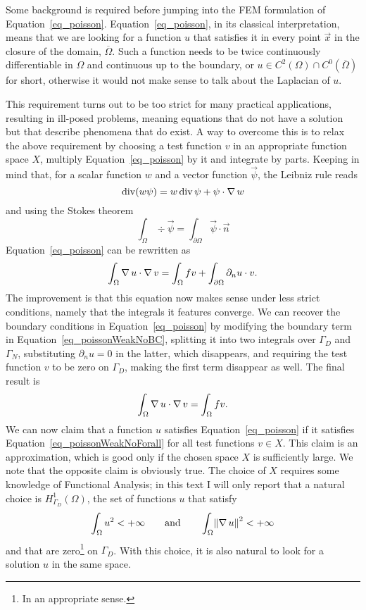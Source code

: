 Some background is required before jumping into the FEM formulation of Equation~\eqref{eq_poisson}.
Equation~\eqref{eq_poisson}, in its classical interpretation, means that we are looking for a function \(u\) that satisfies it in every point \(\vec{x}\) in the closure of the domain, \(\overline\Omega\).
Such a function needs to be twice continuously differentiable in \(\Omega\) and continuous up to the boundary, or \(u \in C^2(\Omega) \cap C^0(\overline\Omega)\) for short, otherwise it would not make sense to talk about the Laplacian of \(u\).

This requirement turns out to be too strict for many practical applications, resulting in ill-posed problems, meaning equations that do not have a solution but that describe phenomena that do exist.
A way to overcome this is to relax the above requirement by choosing a test function \(v\) in an appropriate function space \(X\), multiply Equation~\eqref{eq_poisson} by it and integrate by parts.
Keeping in mind that, for a scalar function \(w\) and a vector function \(\vec{\psi}\), the Leibniz rule reads
\begin{equation}
  \operatorname{div}(w \mathbf{\psi}) = w \operatorname{div} \mathbf{\psi} + \mathbf{\psi} \cdot \operatorname{\nabla} w
  \label{eq_leibniz}
\end{equation}
and using the Stokes theorem
\begin{equation}
  \int_\Omega \div \vec{\psi} = \int_{\partial\Omega} \vec{\psi} \cdot \vec{n}
  \label{eq_stokes}
\end{equation}
Equation~\eqref{eq_poisson} can be rewritten as
\begin{equation}
  \int_\Omega \operatorname{\nabla} u \cdot \operatorname{\nabla} v = \int_\Omega f v + \int_{\partial\Omega} \partial_{n} u \cdot v.
  \label{eq_poissonWeakNoBC}
\end{equation}
The improvement is that this equation now makes sense under less strict
conditions, namely that the integrals it features converge.
We can recover the boundary conditions in Equation~\eqref{eq_poisson} by
modifying the boundary term in Equation~\eqref{eq_poissonWeakNoBC},
splitting it into two integrals over \(\Gamma_D\) and \(\Gamma_N\),
substituting \(\partial_{n} u = 0\) in the latter, which disappears, and requiring the test function \(v\) to
be zero on \(\Gamma_D\), making the first term disappear as well.
The final result is
\begin{equation}
  \int_\Omega \operatorname{\nabla} u \cdot \operatorname{\nabla} v = \int_\Omega f v.
  \label{eq_poissonWeakNoForall}
\end{equation}
We can now claim that a function \(u\) satisfies
Equation~\eqref{eq_poisson} if it satisfies
Equation~\eqref{eq_poissonWeakNoForall} for all test functions \(v \in X\).
This claim is an approximation, which is good only if the chosen space
\(X\) is sufficiently large.
We note that the opposite claim is obviously true.
The choice of \(X\) requires some knowledge of Functional Analysis; in
this text I will only report that a natural choice is
\(H^1_{\Gamma_D}(\Omega)\), the set of functions \(u\) that satisfy
\[
  \int_\Omega u^2 < +\infty \qquad \text{and} \qquad \int_\Omega \norm*{\grad u}^2 < +\infty
\]
and that are zero\footnote{In an appropriate sense.} on \(\Gamma_D\).
With this choice, it is also natural to look for a solution \(u\) in the
same space.

